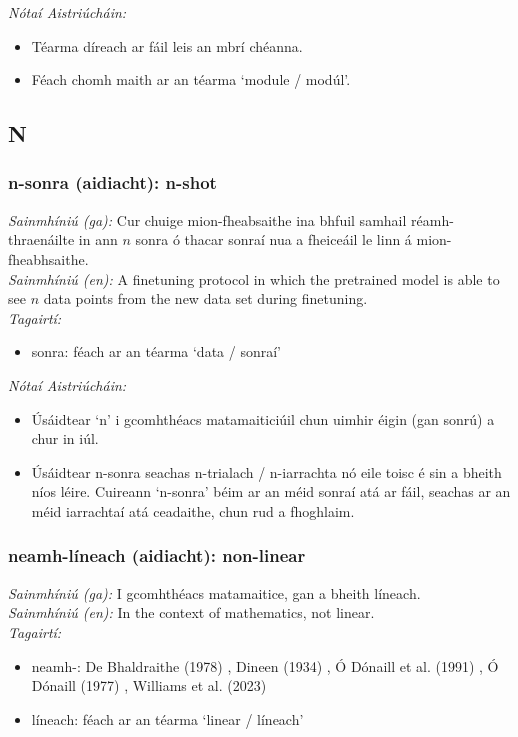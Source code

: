 \documentclass{article}
\begin{document}
 \noindent \textit{Nótaí Aistriúcháin:}
\begin{itemize}
	\item Téarma díreach ar fáil leis an mbrí chéanna.
	\item Féach chomh maith ar an téarma `module / modúl'.
\end{itemize}


\subsection*{N}

\subsubsection*{n-sonra (aidiacht): n-shot}
 \noindent \textit{Sainmhíniú (ga):} Cur chuige mion-fheabsaithe ina bhfuil samhail réamh-thraenáilte in ann $n$ sonra ó thacar sonraí nua a fheiceáil le linn á mion-fheabhsaithe.
\\
 \noindent \textit{Sainmhíniú (en):} A finetuning protocol in which the pretrained model is able to see $n$ data points from the new data set during finetuning.
\\
 \noindent \textit{Tagairtí:}
\begin{itemize}
	\item sonra: féach ar an téarma `data / sonraí'
\end{itemize}

 \noindent \textit{Nótaí Aistriúcháin:}
\begin{itemize}
	\item Úsáidtear `n' i gcomhthéacs matamaiticiúil chun uimhir éigin (gan sonrú) a chur in iúl.
	\item Úsáidtear n-sonra seachas n-trialach / n-iarrachta nó eile toisc é sin a bheith níos léire. Cuireann `n-sonra' béim ar an méid sonraí atá ar fáil, seachas ar an méid iarrachtaí atá ceadaithe, chun rud a fhoghlaim.
\end{itemize}


\subsubsection*{neamh-líneach (aidiacht): non-linear}
 \noindent \textit{Sainmhíniú (ga):} I gcomhthéacs matamaitice, gan a bheith líneach.
\\
 \noindent \textit{Sainmhíniú (en):} In the context of mathematics, not linear.
\\
 \noindent \textit{Tagairtí:}
\begin{itemize}
	\item neamh-: De Bhaldraithe (1978) \cite{de-bhaldraithe}, Dineen (1934) \cite{dineen}, Ó Dónaill et al. (1991) \cite{focloir-beag}, Ó Dónaill (1977) \cite{odonaill}, Williams et al. (2023) \cite{storchiste}
	\item líneach: féach ar an téarma `linear / líneach'
\end{itemize}
\end{document}
